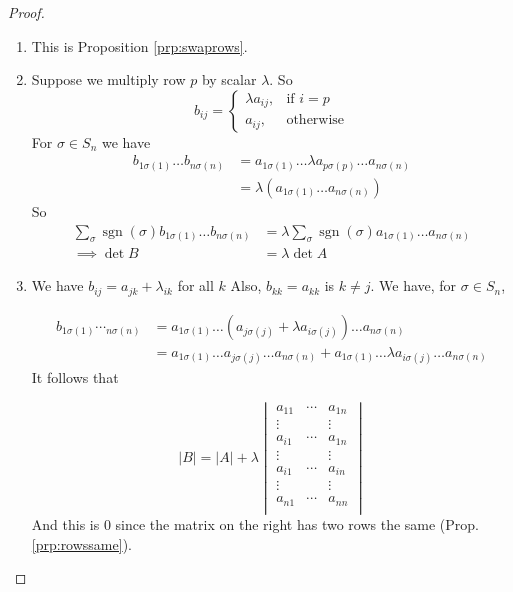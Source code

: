 \documentclass{article}
\theoremstyle{definition}
\newcommand{\elemt}[2]{#1_{{#2}\sigma(#2)}}
\DeclareMathOperator{\sgn}{sgn}
\begin{document}
\begin{proof}\hfill
  \begin{enumerate}
    \item This is Proposition \ref{prp:swaprows}.
    \item Suppose we multiply row $p$ by scalar $\lambda$. So
      \[
        b_{ij} = \begin{cases}
          \lambda a_{ij}, & \text{if } i=p \\
          a_{ij}, & \text{otherwise}
                 \end{cases}
      \]
      For $\sigma \in S_n$ we have 
      \begin{align*}
        b_{1\sigma(1)}\dots b_{n\sigma(n)} &= a_{1\sigma(1)}\dots \lambda
        a_{p\sigma(p)}\dots a_{n \sigma(n)} \\
        &= \lambda (  a_{1\sigma(1)}\dots  a_{n\sigma(n)} )
      \end{align*}
      So
      \begin{align*}
        \sum_\sigma \sgn (\sigma)  b_{1\sigma(1)}\dots b_{n\sigma(n)} &=
        \lambda \sum_\sigma \sgn(\sigma)  a_{1\sigma(1)}\dots
        a_{n\sigma(n)}\\
        \implies \det B &= \lambda \det A
      \end{align*}
    \item We have $b_{ij} = a_{jk} + \lambda_{ik}$ for all $k$ Also, $b_{kk}=a_{kk}$ is $k \neq j$. We have, for $\sigma \in S_n$,

      \begin{align*}
        b_{1\sigma(1)}\dotsb_{n\sigma(n)} &= a_{1 \sigma(1)} \dots ( a_{j
        \sigma(j)} + \lambda  a_{i \sigma(j)} ) \dots a_{n\sigma(n)} \\
        &= \elemt{a}{1} \dots \elemt{a}{j} \dots\elemt{a}{n} + \elemt{a}{1} \dots \lambda a_{i\sigma(j)} \dots a_{n\sigma(n)}
      \end{align*}
      It follows that

      \[
        |B| = |A| + \lambda 
        \begin{vmatrix}
          a_{11} & \cdots & a_{1n}\\
          \vdots &        & \vdots \\
          a_{i1} & \cdots & a_{1n} \\
          \vdots &        & \vdots \\
          a_{i1} & \cdots & a_{in} \\
          \vdots &        & \vdots \\
          a_{n1} & \cdots & a_{nn} \\
        \end{vmatrix}
      \]
      And this is 0 since the matrix on the right has two rows the same (Prop. \ref{prp:rowssame}). 
  \end{enumerate}
\end{proof}
\end{document}
